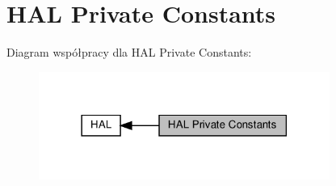 \hypertarget{group___h_a_l___private___constants}{}\section{H\+AL Private Constants}
\label{group___h_a_l___private___constants}
Diagram współpracy dla H\+AL Private Constants\+:\nopagebreak
\begin{figure}[H]
\begin{center}
\leavevmode
\includegraphics[width=270pt]{group___h_a_l___private___constants}
\end{center}
\end{figure}
